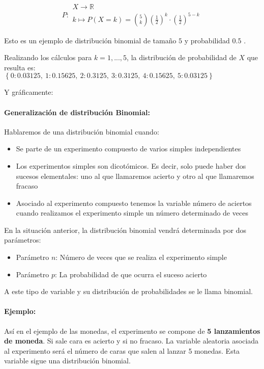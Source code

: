 $$P\colon \begin{array}{l} 
          X \rightarrow \mathbb{R} \\ 
          k\mapsto P(X=k)=\binom{5}{k}\left(\frac{1}{2}\right)^k\cdot  \left(\frac{1}{2}\right)^{5-k} 
         \end{array}$$

Esto es un ejemplo de distribución binomial de tamaño $5$ y probabilidad $0.5$ .

Realizando los cálculos para $k = 1,...,5 $, la distribución de probabilidad de $X$ que resulta es:\\
$\left\{ 0 : 0.03125, \  1 : 0.15625, \  2 : 0.3125, \  3 : 0.3125, \  4 : 0.15625, \  5 : 0.03125 \right\}$

Y gráficamente: 




\paragraph{Generalización de distribución Binomial:} Hablaremos de una distribución binomial cuando:
\begin{itemize}
\item Se parte de un experimento compuesto de varios simples independientes
\item Los experimentos simples son dicotómicos. Es decir, solo puede haber dos sucesos elementales: uno al que llamaremos acierto y otro al que llamaremos fracaso
\item Asociado al experimento compuesto tenemos la variable número de aciertos cuando realizamos el experimento simple un número determinado de veces
\end{itemize}

En la situación anterior, la distribución binomial vendrá determinada por dos parámetros:
\begin{itemize}
\item Parámetro $n$: Número de veces que se realiza el experimento simple 
\item Parámetro $p$: La probabilidad de que ocurra el suceso acierto
\end{itemize}


A este tipo de variable y su distribución de probabilidades se le llama binomial. \\


\paragraph{Ejemplo:} Así en el ejemplo de las monedas, el experimento se compone de \textbf{5 lanzamientos de moneda}. Si sale cara es acierto y si no fracaso. La variable aleatoria asociada al experimento será el número de caras que salen al lanzar 5 monedas. Esta variable sigue una distribución binomial.

